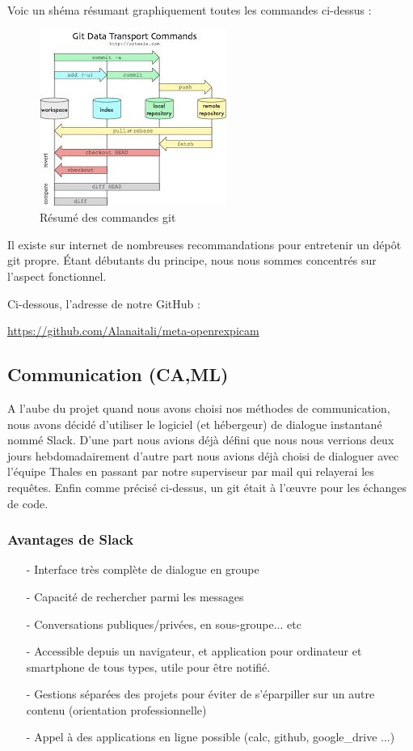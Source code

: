 Voic un shéma résumant graphiquement toutes les commandes ci-dessus :

\begin{figure}[!htb]
    \centering
    \includegraphics[trim={0cm 0cm 0cm 0cm},clip,scale=0.8]{Figures/git.png}
    \decoRule
    \caption{Résumé des commandes git} \label{fig:git}
\end{figure}

Il existe sur internet de nombreuses recommandations pour entretenir un dépôt git propre.
Étant débutants du principe, nous nous sommes concentrés sur l’aspect fonctionnel.

Ci-dessous, l’adresse de notre GitHub :

\href{https://github.com/Alanaitali/meta-openrexpicam}{https://github.com/Alanaitali/meta-openrexpicam}

\subsection{Communication (CA,ML)}

A l’aube du projet quand nous avons choisi nos méthodes de communication, nous avons
décidé d'utiliser le logiciel (et hébergeur) de dialogue instantané nommé Slack. D’une part
nous avions déjà défini que nous nous verrions deux jours hebdomadairement d’autre part
nous avions déjà choisi de dialoguer avec l’équipe Thales en passant par notre
superviseur par mail qui relayerai les requêtes. Enfin comme précisé ci-dessus, un git
était à l’œuvre pour les échanges de code.

\subsubsection{Avantages de Slack}

\begin{itemize}
    \item[-] Interface très complète de dialogue en groupe
    \item[-] Capacité de rechercher parmi les messages
    \item[-] Conversations publiques/privées, en sous-groupe... etc
    \item[-] Accessible depuis un navigateur, et application pour ordinateur et smartphone de tous
    types, utile pour être notifié.
    \item[-] Gestions séparées des projets pour éviter de s’éparpiller sur un autre contenu (orientation
    professionnelle)
    \item[-] Appel à des applications en ligne possible (calc, github, google\_drive ...)
\end{itemize}


